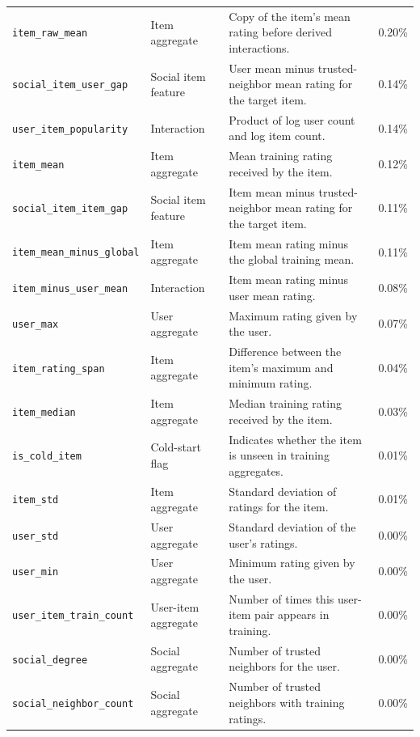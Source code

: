 \documentclass[conference]{IEEEtran}
\begin{document}
\begin{table}[htbp]
\begin{tabular}{p{6.5cm}p{2.4cm}p{7.1cm}p{1.3cm}}
\raggedright\texttt{item\_raw\_mean} & Item aggregate & Copy of the item's mean rating before derived interactions. & 0.20\% \\
\raggedright\texttt{social\_item\_user\_gap} & Social item feature & User mean minus trusted-neighbor mean rating for the target item. & 0.14\% \\
\raggedright\texttt{user\_item\_popularity} & Interaction & Product of log user count and log item count. & 0.14\% \\
\raggedright\texttt{item\_mean} & Item aggregate & Mean training rating received by the item. & 0.12\% \\
\raggedright\texttt{social\_item\_item\_gap} & Social item feature & Item mean minus trusted-neighbor mean rating for the target item. & 0.11\% \\
\raggedright\texttt{item\_mean\_minus\_global} & Item aggregate & Item mean rating minus the global training mean. & 0.11\% \\
\raggedright\texttt{item\_minus\_user\_mean} & Interaction & Item mean rating minus user mean rating. & 0.08\% \\
\raggedright\texttt{user\_max} & User aggregate & Maximum rating given by the user. & 0.07\% \\
\raggedright\texttt{item\_rating\_span} & Item aggregate & Difference between the item's maximum and minimum rating. & 0.04\% \\
\raggedright\texttt{item\_median} & Item aggregate & Median training rating received by the item. & 0.03\% \\
\raggedright\texttt{is\_cold\_item} & Cold-start flag & Indicates whether the item is unseen in training aggregates. & 0.01\% \\
\raggedright\texttt{item\_std} & Item aggregate & Standard deviation of ratings for the item. & 0.01\% \\
\raggedright\texttt{user\_std} & User aggregate & Standard deviation of the user's ratings. & 0.00\% \\
\raggedright\texttt{user\_min} & User aggregate & Minimum rating given by the user. & 0.00\% \\
\raggedright\texttt{user\_item\_train\_count} & User-item aggregate & Number of times this user-item pair appears in training. & 0.00\% \\
\raggedright\texttt{social\_degree} & Social aggregate & Number of trusted neighbors for the user. & 0.00\% \\
\raggedright\texttt{social\_neighbor\_count} & Social aggregate & Number of trusted neighbors with training ratings. & 0.00\% \\

\end{tabular}
\end{table}
\end{document}
